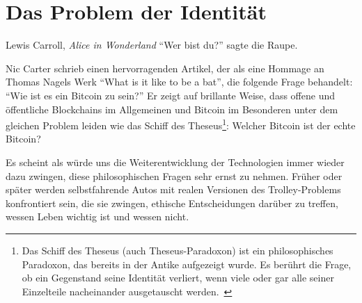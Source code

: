 \chapter{Das Problem der Identität}
\label{les:4}

\begin{chapquote}{Lewis Carroll, \textit{Alice in Wonderland}}
  \enquote{Wer bist du?} sagte die Raupe.
\end{chapquote}

Nic Carter schrieb einen hervorragenden Artikel, der als eine Hommage an Thomas
Nagels Werk \enquote{What is it like to be a bat}, die folgende Frage behandelt:
\enquote{Wie ist es ein Bitcoin zu sein?} Er zeigt auf brillante Weise, dass
offene und öffentliche Blockchains im Allgemeinen und Bitcoin im Besonderen
unter dem gleichen Problem leiden wie das Schiff des Theseus\footnote{ Das
Schiff des Theseus (auch Theseus-Paradoxon) ist ein philosophisches Paradoxon,
das bereits in der Antike aufgezeigt wurde. Es berührt die Frage, ob ein
Gegenstand seine Identität verliert, wenn viele oder gar alle seiner Einzelteile
nacheinander ausgetauscht werden.~\cite{wiki:theseus}}: Welcher Bitcoin ist der
echte Bitcoin?

\begin{quotation}\end{quotation}

Es scheint als würde uns die Weiterentwicklung der Technologien immer wieder
dazu zwingen, diese philosophischen Fragen sehr ernst zu nehmen. Früher oder
später werden selbstfahrende Autos mit realen Versionen des Trolley-Problems
konfrontiert sein, die sie zwingen, ethische Entscheidungen darüber zu treffen,
wessen Leben wichtig ist und wessen nicht.

